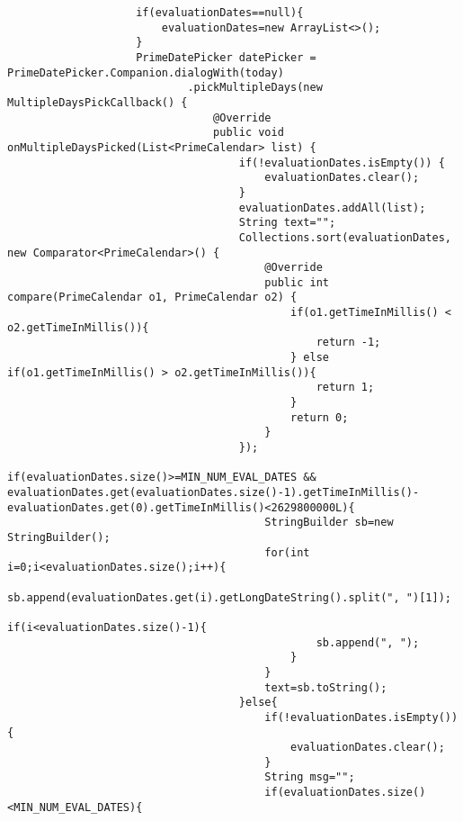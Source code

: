 \begin{itemize}
\begin{lstlisting}
                    if(evaluationDates==null){
                        evaluationDates=new ArrayList<>();
                    }
                    PrimeDatePicker datePicker = PrimeDatePicker.Companion.dialogWith(today)
                            .pickMultipleDays(new MultipleDaysPickCallback() {
                                @Override
                                public void onMultipleDaysPicked(List<PrimeCalendar> list) {
                                    if(!evaluationDates.isEmpty()) {
                                        evaluationDates.clear();
                                    }
                                    evaluationDates.addAll(list);
                                    String text="";
                                    Collections.sort(evaluationDates, new Comparator<PrimeCalendar>() {
                                        @Override
                                        public int compare(PrimeCalendar o1, PrimeCalendar o2) {
                                            if(o1.getTimeInMillis() < o2.getTimeInMillis()){
                                                return -1;
                                            } else if(o1.getTimeInMillis() > o2.getTimeInMillis()){
                                                return 1;
                                            }
                                            return 0;
                                        }
                                    });
                                    if(evaluationDates.size()>=MIN_NUM_EVAL_DATES && evaluationDates.get(evaluationDates.size()-1).getTimeInMillis()-evaluationDates.get(0).getTimeInMillis()<2629800000L){
                                        StringBuilder sb=new StringBuilder();
                                        for(int i=0;i<evaluationDates.size();i++){
                                            sb.append(evaluationDates.get(i).getLongDateString().split(", ")[1]);
                                            if(i<evaluationDates.size()-1){
                                                sb.append(", ");
                                            }
                                        }
                                        text=sb.toString();
                                    }else{
                                        if(!evaluationDates.isEmpty()) {
                                            evaluationDates.clear();
                                        }
                                        String msg="";
                                        if(evaluationDates.size()<MIN_NUM_EVAL_DATES){

\end{lstlisting}
\end{itemize}
